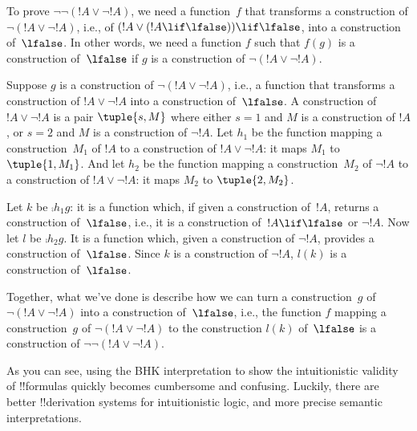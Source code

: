 \documentclass[../../../include/open-logic-section]{subfiles}
\begin{document}
\begin{ex}
To prove $\lnot \lnot (!A \lor \lnot !A)$, we need a function~$f$ that
transforms a construction of $\lnot(!A \lor \lnot !A)$, i.e., of $(!A
\lor (!A \lif \lfalse)) \lif \lfalse$, into a construction
of~$\lfalse$.  In other words, we need a function $f$ such that $f(g)$
is a construction of~$\lfalse$ if $g$ is a construction of $\lnot(!A
\lor \lnot !A)$.

Suppose $g$ is a construction of $\lnot(!A \lor \lnot !A)$, i.e., a
function that transforms a construction of $!A \lor \lnot !A$ into a
construction of~$\lfalse$.  A construction of $!A \lor \lnot !A$ is a
pair $\tuple{s, M}$ where either $s = 1$ and $M$ is a construction of
$!A$, or $s = 2$ and $M$ is a construction of $\lnot !A$. Let $h_1$ be
the function mapping a construction~$M_1$ of $!A$ to a construction of
$!A \lor \lnot !A$: it maps $M_1$ to $\tuple{1, M_1}$. And let $h_2$
be the function mapping a construction~$M_2$ of $\lnot !A$ to a
construction of $!A \lor \lnot !A$: it maps $M_2$ to $\tuple{2, M_2}$.

Let $k$ be $\comp{h_1}{g}$: it is a function which, if given a
construction of~$!A$, returns a construction of~$\lfalse$, i.e., it is
a construction of~$!A \lif \lfalse$ or $\lnot !A$. Now let $l$ be
$\comp{h_2}{g}$. It is a function which, given a construction of
$\lnot !A$, provides a construction of~$\lfalse$. Since $k$ is a
construction of $\lnot !A$, $l(k)$ is a construction of~$\lfalse$.

Together, what we've done is describe how we can turn a
construction~$g$ of $\lnot(!A \lor \lnot !A)$ into a construction
of~$\lfalse$, i.e., the function $f$ mapping a construction~$g$ of
$\lnot(!A \lor \lnot !A)$ to the construction $l(k)$ of~$\lfalse$ is a
construction of $\lnot\lnot(!A \lor \lnot !A)$.
\end{ex}

As you can see, using the BHK interpretation to show the
intuitionistic validity of !!{formula}s quickly becomes cumbersome
and confusing. Luckily, there are better !!{derivation} systems for
intuitionistic logic, and more precise semantic interpretations.
\end{document}
